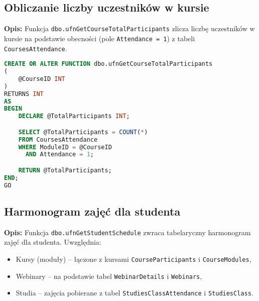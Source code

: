 \documentclass[12pt]{article}
\begin{document}
\subsection{Obliczanie liczby uczestników w kursie}
\label{sec:course_total_participants}

\textbf{Opis:} Funkcja \texttt{dbo.ufnGetCourseTotalParticipants} zlicza liczbę uczestników w kursie na podstawie obecności (pole \texttt{Attendance = 1}) z tabeli \texttt{CoursesAttendance}.

 
\begin{lstlisting}[language=SQL]
CREATE OR ALTER FUNCTION dbo.ufnGetCourseTotalParticipants
(
    @CourseID INT
)
RETURNS INT
AS
BEGIN
    DECLARE @TotalParticipants INT;

    SELECT @TotalParticipants = COUNT(*)
    FROM CoursesAttendance
    WHERE ModuleID = @CourseID
      AND Attendance = 1;

    RETURN @TotalParticipants;
END;
GO
\end{lstlisting}
\newpage
\subsection{Harmonogram zajęć dla studenta}
\label{sec:student_schedule}

\textbf{Opis:} Funkcja \texttt{dbo.ufnGetStudentSchedule} zwraca tabelaryczny harmonogram zajęć dla studenta. Uwzględnia:
\begin{itemize}
    \item Kursy (moduły) – łączone z kursami \texttt{CourseParticipants} i \texttt{CourseModules},
    \item Webinary – na podstawie tabel \texttt{WebinarDetails} i \texttt{Webinars},
    \item Studia – zajęcia pobierane z tabel \texttt{StudiesClassAttendance} i \texttt{StudiesClass}.
\end{itemize}
\end{document}
